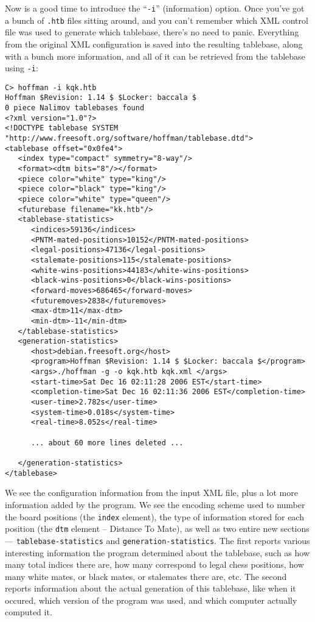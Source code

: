 \documentclass[11pt]{article}
\begin{document}
Now is a good time to introduce the ``{\tt -i}'' (information) option.
Once you've got a bunch of {\tt .htb} files sitting around, and you
can't remember which XML control file was used to generate which
tablebase, there's no need to panic.  Everything from the original XML
configuration is saved into the resulting tablebase, along with a
bunch more information, and all of it can be retrieved from the
tablebase using {\tt -i}:

{\small\begin{verbatim}
C> hoffman -i kqk.htb
Hoffman $Revision: 1.14 $ $Locker: baccala $
0 piece Nalimov tablebases found
<?xml version="1.0"?>
<!DOCTYPE tablebase SYSTEM "http://www.freesoft.org/software/hoffman/tablebase.dtd">
<tablebase offset="0x0fe4">
   <index type="compact" symmetry="8-way"/>
   <format><dtm bits="8"/></format>
   <piece color="white" type="king"/>
   <piece color="black" type="king"/>
   <piece color="white" type="queen"/>
   <futurebase filename="kk.htb"/>
   <tablebase-statistics>
      <indices>59136</indices>
      <PNTM-mated-positions>10152</PNTM-mated-positions>
      <legal-positions>47136</legal-positions>
      <stalemate-positions>115</stalemate-positions>
      <white-wins-positions>44183</white-wins-positions>
      <black-wins-positions>0</black-wins-positions>
      <forward-moves>686465</forward-moves>
      <futuremoves>2838</futuremoves>
      <max-dtm>11</max-dtm>
      <min-dtm>-11</min-dtm>
   </tablebase-statistics>
   <generation-statistics>
      <host>debian.freesoft.org</host>
      <program>Hoffman $Revision: 1.14 $ $Locker: baccala $</program>
      <args>./hoffman -g -o kqk.htb kqk.xml </args>
      <start-time>Sat Dec 16 02:11:28 2006 EST</start-time>
      <completion-time>Sat Dec 16 02:11:36 2006 EST</completion-time>
      <user-time>2.782s</user-time>
      <system-time>0.018s</system-time>
      <real-time>8.052s</real-time>

      ... about 60 more lines deleted ...

   </generation-statistics>
</tablebase>
\end{verbatim}}

We see the configuration information from the input XML file, plus a
 lot more information added by the program.  We see the encoding
 scheme used to number the board positions (the {\tt index} element),
 the type of information stored for each position (the {\tt dtm}
 element -- Distance To Mate), as well as two entire new sections ---
 {\tt tablebase-statistics} and {\tt generation-statistics}.  The
 first reports various interesting information the program determined
 about the tablebase, such as how many total indices there are, how
 many correspond to legal chess positions, how many white mates, or
 black mates, or stalemates there are, etc.  The second reports
 information about the actual generation of this tablebase, like when
 it occured, which version of the program was used, and which computer
 actually computed it.
\end{document}
